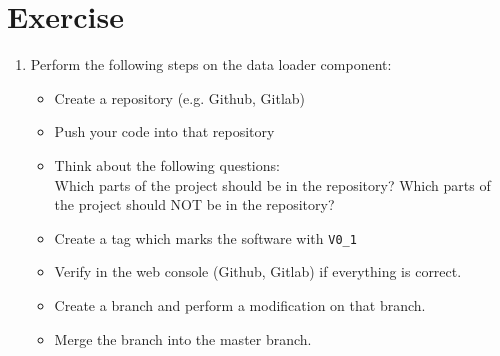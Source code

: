 %
\newslide
\section{Exercise}
\begin{enumerate}
\item Perform the following steps on the data loader component:
\begin{itemize}
\item Create a repository (e.g. Github, Gitlab)
\item Push your code into that repository
\item Think about the following questions:\\
Which parts of the project should be in the repository?
Which parts of the project should NOT be in the repository?
\item Create a tag which marks the software with \verb|V0_1|
\item Verify in the web console (Github, Gitlab) if
everything is correct.
\item Create a branch and perform a modification on that branch.
\item Merge the branch into the master branch.
\end{itemize}

\end{enumerate}
\newslide
